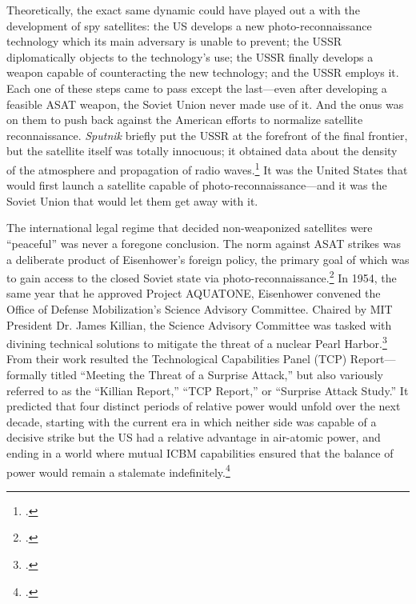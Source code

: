 \documentclass{report}
\begin{document}
Theoretically, the exact same dynamic could have played out a with the development of spy satellites: the US develops a new photo-reconnaissance technology which its main adversary is unable to prevent; the USSR diplomatically objects to the technology's use; the USSR finally develops a weapon capable of counteracting the new technology; and the USSR employs it. Each one of these steps came to pass except the last---even after developing a feasible ASAT weapon, the Soviet Union never made use of it. And the onus was on them to push back against the American efforts to normalize satellite reconnaissance. \emph{Sputnik} briefly put the USSR at the forefront of the final frontier, but the satellite itself was totally innocuous; it obtained data about the density of the atmosphere and propagation of radio waves.\footcite{nasa_sputnik_2019} It was the United States that would first launch a satellite capable of photo-reconnaissance---and it was the Soviet Union that would let them get away with it.

The international legal regime that decided non-weaponized satellites were ``peaceful'' was never a foregone conclusion. The norm against ASAT strikes was a deliberate product of Eisenhower's foreign policy, the primary goal of which was to gain access to the closed Soviet state via photo-reconnaissance.\footcite[p.~65]{hayes_struggling_1994} In 1954, the same year that he approved Project AQUATONE, Eisenhower convened the Office of Defense Mobilization's Science Advisory Committee. Chaired by MIT President Dr. James Killian, the Science Advisory Committee was tasked with divining technical solutions to mitigate the threat of a nuclear Pearl Harbor.\footcite[p.~115]{mcdougall_heavens_1985} From their work resulted the Technological Capabilities Panel (TCP) Report---formally titled ``Meeting the Threat of a Surprise Attack,'' but also variously referred to as the ``Killian Report,'' ``TCP Report,'' or ``Surprise Attack Study.'' It predicted that four distinct periods of relative power would unfold over the next decade, starting with the current era in which neither side was capable of a decisive strike but the US had a relative advantage in air-atomic power, and ending in a world where mutual ICBM capabilities ensured that the balance of power would remain a stalemate indefinitely.\footcite[p.~116]{mcdougall_heavens_1985}
\end{document}
